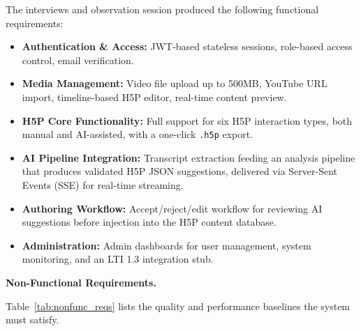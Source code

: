 The interviews and observation session produced the following functional requirements:
\begin{itemize}
  \item \textbf{Authentication \& Access:} JWT-based stateless sessions, role-based access control, email verification.
  \item \textbf{Media Management:} Video file upload up to 500MB, YouTube URL import, timeline-based H5P editor, real-time content preview.
  \item \textbf{H5P Core Functionality:} Full support for six H5P interaction types, both manual and AI-assisted, with a one-click \texttt{.h5p} export.
  \item \textbf{AI Pipeline Integration:} Transcript extraction feeding an analysis pipeline that produces validated H5P JSON suggestions, delivered via Server-Sent Events (SSE) for real-time streaming.
  \item \textbf{Authoring Workflow:} Accept/reject/edit workflow for reviewing AI suggestions before injection into the H5P content database.
  \item \textbf{Administration:} Admin dashboards for user management, system monitoring, and an LTI 1.3 integration stub.
\end{itemize}
\clearpage
\textbf{Non-Functional Requirements.}

Table~\ref{tab:nonfunc_reqs} lists the quality and performance baselines the system must satisfy.


